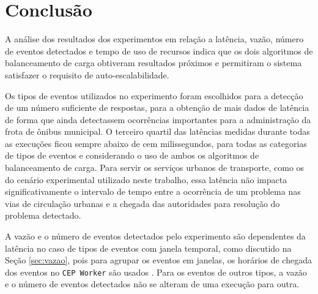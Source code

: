 






\section{Conclusão}


A análise dos resultados dos experimentos em relação a latência, vazão, número de eventos detectados e tempo de uso de recursos indica que os dois algoritmos de balanceamento de carga obtiveram resultados próximos e permitiram o sistema satisfazer o requisito de auto-escalabilidade. 

Os tipos de eventos utilizados no experimento foram escolhidos para a detecção de um número suficiente de respostas, para a obtenção de mais dados de latência de forma que ainda detectassem ocorrências importantes para a administração da frota de ônibus municipal. O terceiro quartil das latências medidas durante todas as execuções ficou sempre abaixo de cem milissegundos, para todas as categorias de tipos de eventos e considerando o uso de ambos os algoritmos de balanceamento de carga. Para servir os serviços urbanos de transporte, como os do cenário experimental utilizado neste trabalho, essa latência não impacta significativamente o intervalo de tempo entre a  ocorrência de um problema nas vias de circulação urbanas e a chegada das autoridades para resolução do problema detectado. 


A vazão e o número de eventos detectados pelo experimento são dependentes da latência no caso de tipos de eventos com janela temporal, como discutido na Seção \ref{sec:vazao}, pois para agrupar os eventos em janelas, os horários de chegada dos eventos no \texttt{CEP Worker} são usados%
. Para os eventos de outros tipos, a vazão e o número de eventos detectados não se alteram de uma execução para outra.

